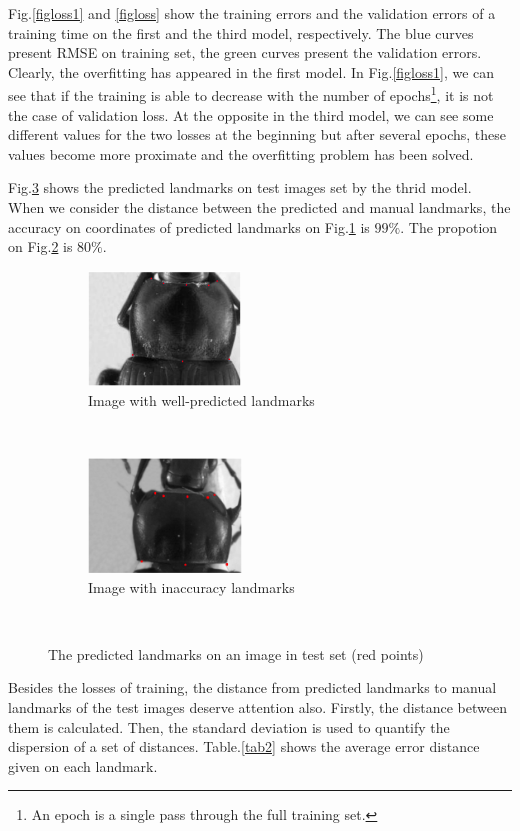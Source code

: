 \documentclass[conference]{IEEEtran}
\begin{document}
Fig.\ref{figloss1} and \ref{figloss} show the training errors and the validation errors of a training time on the first and the third model, respectively. The blue curves present RMSE on training set, the green curves present the validation errors. Clearly, the overfitting has appeared in the first model. In Fig.\ref{figloss1}, we can see that if the training is able to decrease with the number of epochs\footnote{An epoch is a single pass through the full training set.}, it is not the case of validation loss. At the opposite in the third model, we can see some different values for the two losses at the beginning but after several epochs, these values become more proximate and the overfitting problem has been solved.

Fig.\ref{figrsexample} shows the predicted landmarks on test images set by the thrid model. When we consider the distance between the predicted and manual landmarks, the accuracy on coordinates of predicted landmarks on Fig.\ref{figsub1} is $99\%$. The propotion on Fig.\ref{figsub2} is $80\%$.

\begin{figure}[h]
    \centering
    \begin{subfigure}[t]{0.25\textwidth}
        \centering
        \includegraphics[height=1.2in]{images/plandmark}
        \caption{Image with well-predicted landmarks}
        \label{figsub1}
    \end{subfigure}%
    ~ 
    \begin{subfigure}[t]{0.25\textwidth}
        \centering
        \includegraphics[height=1.2in]{images/plandmark2}
        \caption{Image with inaccuracy landmarks}
        \label{figsub2}
    \end{subfigure}
    \caption{The predicted landmarks on an image in test set (red points)}\
    \label{figrsexample}
\end{figure}
Besides the losses of training, the distance from predicted landmarks to manual landmarks of the test images deserve attention also. Firstly, the distance between them is calculated. Then, the standard deviation \cite{bland1996statistics} is used to quantify the dispersion of a set of distances. Table.\ref{tab2} shows the average error distance given on each landmark.
\end{document}
